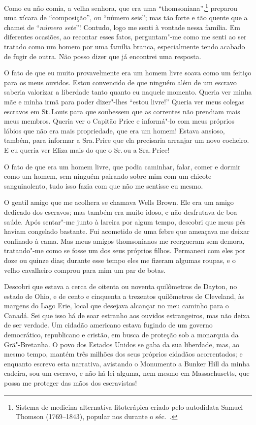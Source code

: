 Como eu não comia, a velha senhora, que era uma
``thomsoniana'',\footnote{Sistema de medicina alternativa fitoterápica
  criado pelo autodidata Samuel Thomson (1769--1843), popular nos 
  durante o séc.~.} preparou uma xícara de ``composição'', ou
``número seis''; mas tão forte e tão quente que a chamei de
``\emph{número sete}''! Contudo, logo me senti à vontade nessa família.
Em diferentes ocasiões, ao recontar esses fatos, perguntam"-me como me
senti ao ser tratado como um homem por uma família branca, especialmente
tendo acabado de fugir de outra. Não posso dizer que já encontrei uma
resposta.

O fato de que eu muito provavelmente era um homem livre soava como um
feitiço para os meus ouvidos. Estou convencido de que ninguém além de um
escravo saberia valorizar a liberdade tanto quanto eu naquele momento.
Queria ver minha mãe e minha irmã para poder dizer"-lhes ``estou livre!''
Queria ver meus colegas escravos em St.\,Louis para que soubessem que as
correntes não prendiam mais meus membros. Queria ver o Capitão Price e
informá"-lo com meus próprios lábios que não era mais propriedade, que
era um homem! Estava ansioso, também, para informar a Sra.\,Price que ela
precisaria arranjar um novo cocheiro. E eu queria ver Eliza mais do que
o Sr.\,ou a Sra.\,Price!

O fato de que era um homem livre, que podia caminhar, falar, comer e
dormir como um homem, sem ninguém pairando sobre mim com um chicote
sanguinolento, tudo isso fazia com que não me sentisse eu mesmo.

O gentil amigo que me acolhera se chamava Wells Brown. Ele era um amigo
dedicado dos escravos; mas também era muito idoso, e não desfrutava de
boa saúde. Após sentar"-me junto à lareira por algum tempo, descobri que
meus pés haviam congelado bastante. Fui acometido de uma febre que
ameaçava me deixar confinado à cama. Mas meus amigos thomsonianos me
reergueram sem demora, tratando"-me como se fosse um dos seus próprios
filhos. Permaneci com eles por doze ou quinze dias; durante esse tempo
eles me fizeram algumas roupas, e o velho cavalheiro comprou para mim um
par de botas.

Descobri que estava a cerca de oitenta ou noventa quilômetros de Dayton,
no estado de Ohio, e de cento e cinquenta a trezentos quilômetros de
Cleveland, às margens do Lago Erie, local que desejava alcançar no meu
caminho para o Canadá. Sei que isso há de soar estranho aos ouvidos
estrangeiros, mas não deixa de ser verdade. Um cidadão americano estava
fugindo de um governo democrático, republicano e cristão, em busca de
proteção sob a monarquia da Grã"-Bretanha. O povo dos Estados Unidos se
gaba da sua liberdade, mas, ao mesmo tempo, mantém três milhões dos seus
próprios cidadãos acorrentados; e enquanto escrevo esta narrativa,
avistando o Monumento a Bunker Hill da minha cadeira, sou um escravo, e
não há lei alguma, nem mesmo em Massachusetts, que possa me proteger das
mãos dos escravistas!


